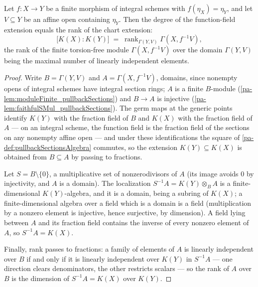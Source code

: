 \begin{theorem}
  \label{pa-thm:finrank_functionField_eq_finrank_pullbackSections}
  \leanok

  Let \(f : X \to Y\) be a finite morphism of integral schemes with
  \(f(\eta_X) = \eta_Y\), and let \(V \subseteq Y\) be an affine open containing
  \(\eta_Y\). Then the degree of the function-field extension equals the rank of the
  chart extension:
  \[
    \bigl[K(X) : K(Y)\bigr]
      \;=\; \operatorname{rank}_{\Gamma(Y, V)} \Gamma(X, f^{-1}V),
  \]
  the rank of the finite torsion-free module \(\Gamma(X, f^{-1}V)\) over the domain
  \(\Gamma(Y, V)\) being the maximal number of linearly independent elements.
\end{theorem}
\begin{proof}
  \leanok
  Write \(B = \Gamma(Y, V)\) and \(A = \Gamma(X, f^{-1}V)\), domains, since nonempty
  opens of integral schemes have integral section rings; \(A\) is a finite \(B\)-module
  (\ref{pa-lem:moduleFinite_pullbackSections}) and \(B \to A\) is injective
  (\ref{pa-lem:faithfulSMul_pullbackSections}). The germ maps at the generic points
  identify \(K(Y)\) with the fraction field of \(B\) and \(K(X)\) with the fraction
  field of \(A\) --- on an integral scheme, the function field is the fraction field of
  the sections on any nonempty affine open --- and under these identifications the
  square of \ref{pa-def:pullbackSectionsAlgebra} commutes, so the extension
  \(K(Y) \subseteq K(X)\) is obtained from \(B \subseteq A\) by passing to fractions.

  Let \(S = B \setminus \{0\}\), a multiplicative set of nonzerodivisors of \(A\) (its
  image avoids \(0\) by injectivity, and \(A\) is a domain). The localization
  \(S^{-1}A = K(Y) \otimes_B A\) is a finite-dimensional \(K(Y)\)-algebra, and it is a
  domain, being a subring of \(K(X)\); a finite-dimensional algebra over a field which
  is a domain is a field (multiplication by a nonzero element is injective, hence
  surjective, by dimension). A field lying between \(A\) and its fraction field
  contains the inverse of every nonzero element of \(A\), so \(S^{-1}A = K(X)\).

  Finally, rank passes to fractions: a family of elements of \(A\) is linearly
  independent over \(B\) if and only if it is linearly independent over \(K(Y)\) in
  \(S^{-1}A\) --- one direction clears denominators, the other restricts scalars ---
  so the rank of \(A\) over \(B\) is the dimension of \(S^{-1}A = K(X)\) over
  \(K(Y)\).
\end{proof}

